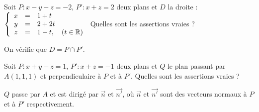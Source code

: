 \begin{question} 
Soit $P : x-y-z=-2$,  $P' : x+z=2$ deux plans et $D$ la droite :
$\left\{\begin{array}{ccl}x&=&1+t\\y&=&2+2t\\ z&=&1-t,\quad (t\in \mathbb{R})\end{array}\right.$ Quelles sont les assertions vraies ?
\begin{answers}


 
    
    
     
   
\end{answers}
\begin{explanations}
On vérifie que  $D=P\cap P'$.
\end{explanations}

\end{question}


\begin{question} 
Soit $P : x+y-z=1$,  $P' : x+z=-1$ deux plans et $Q$ le plan passant par $A(1,1,1)$ et perpendiculaire à $P$ et à $P'$. Quelles sont les assertions vraies ?
\begin{answers}


 
    
    
\end{answers}

\begin{explanations}
$Q$ passe par $A$ et est dirigé par $\vec{n}$ et $\vec{n'}$, où $\vec{n}$ et $\vec{n'}$ sont des vecteurs normaux à $P$ et à $P'$ respectivement.
\end{explanations}

\end{question}



